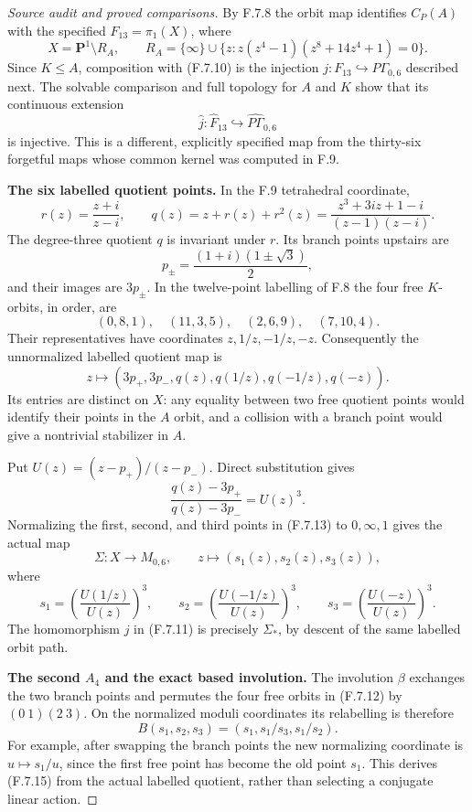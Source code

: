 \begin{proof}[Source audit and proved comparisons]
By F.7.8 the orbit map identifies $C_P(A)$ with the specified
$F_{13}=\pi_1(X)$, where
\[
 X=\mathbf P^1\setminus R_A,\qquad
 R_A=\{\infty\}\cup\{z:z(z^4-1)(z^8+14z^4+1)=0\}.
\]
Since $K\leq A$, composition with (F.7.10) is the injection
$j:F_{13}\hookrightarrow P\Gamma_{0,6}$ described next.
The solvable comparison and full topology for $A$ and $K$
show that its continuous extension
\[
                \widehat j:\widehat F_{13}
                       \hookrightarrow\widehat{P\Gamma}_{0,6}
                                                               \tag{F.7.11}
\]
is injective.  This is a different, explicitly specified map
from the thirty-six forgetful maps whose common kernel was
computed in F.9.

\medskip\noindent\textbf{The six labelled quotient points.}
In the F.9 tetrahedral coordinate,
\[
 r(z)=\frac{z+i}{z-i},\qquad
 q(z)=z+r(z)+r^2(z)
     =\frac{z^3+3iz+1-i}{(z-1)(z-i)}.
\]
The degree-three quotient $q$ is invariant under $r$.
Its branch points upstairs are
\[
 p_\pm=\frac{(1+i)(1\pm\sqrt3)}2,
\]
and their images are $3p_\pm$.  In the twelve-point
labelling of F.8 the four free $K$-orbits, in order, are
\[
 (0,8,1),\quad(11,3,5),\quad(2,6,9),\quad(7,10,4).
                                                               \tag{F.7.12}
\]
Their representatives have coordinates $z,1/z,-1/z,-z$.
Consequently the unnormalized labelled quotient map is
\[
 z\longmapsto
   (3p_+,3p_-,q(z),q(1/z),q(-1/z),q(-z)).                \tag{F.7.13}
\]
Its entries are distinct on $X$: any equality between two
free quotient points would identify their points in the
$A$ orbit, and a collision with a branch point would give a
nontrivial stabilizer in $A$.

Put $U(z)=(z-p_+)/(z-p_-)$.
Direct substitution gives
\[
       \frac{q(z)-3p_+}{q(z)-3p_-}=U(z)^3.
\]
Normalizing the first, second, and third points in (F.7.13)
to $0,\infty,1$ gives the actual map
\[
 \Sigma:X\longrightarrow M_{0,6},\qquad
 z\longmapsto(s_1(z),s_2(z),s_3(z)),
\]
where
\[
 s_1=\left(\frac{U(1/z)}{U(z)}\right)^3,
 \qquad
 s_2=\left(\frac{U(-1/z)}{U(z)}\right)^3,
 \qquad
 s_3=\left(\frac{U(-z)}{U(z)}\right)^3.                 \tag{F.7.14}
\]
The homomorphism $j$ in (F.7.11) is precisely $\Sigma_*$,
by descent of the same labelled orbit path.

\medskip\noindent\textbf{The second $A_4$ and the exact based involution.}
The involution $\beta$ exchanges the two branch points and
permutes the four free orbits in (F.7.12) by $(0\ 1)(2\ 3)$.
On the normalized moduli coordinates its relabelling is
therefore
\[
 B(s_1,s_2,s_3)=(s_1,s_1/s_3,s_1/s_2).                 \tag{F.7.15}
\]
For example, after swapping the branch points the new
normalizing coordinate is $u\mapsto s_1/u$, since the
first free point has become the old point $s_1$.
This derives (F.7.15) from the actual labelled quotient,
rather than selecting a conjugate linear action.


\end{proof}
